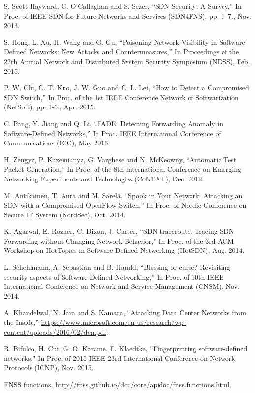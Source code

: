 \documentclass[conference]{IEEEtran}
\begin{document}
%
%
%
\begin{thebibliography}{1}

S. Scott-Hayward, G. O’Callaghan and S. Sezer,
``SDN Security: A Survey,'' In Proc. of IEEE SDN for Future Networks and Services (SDN4FNS), pp. 1–7., Nov. 2013.

S. Hong, L. Xu, H. Wang and G. Gu,
``Poisoning Network Visibility in Software-Defined Networks: New Attacks and Countermeasures,''  In Proceedings of the 22th Annual Network and Distributed System Security Symposium (NDSS), Feb. 2015.

P. W. Chi, C. T. Kuo, J. W. Guo and C. L. Lei,
``How to Detect a Compromised SDN Switch,'' In Proc. of the 1st IEEE Conference Network of Softwarization (NetSoft), pp. 1-6., Apr. 2015.

C. Pang, Y. Jiang and Q. Li,
``FADE: Detecting Forwarding Anomaly in Software-Defined Networks,'' In Proc. IEEE International Conference of Communications (ICC), May 2016.

H. Zengyz, P. Kazemianyz, G. Varghese and N. McKeowny,
``Automatic Test Packet Generation,'' In Proc. of the 8th International Conference on Emerging Networking Experiments and Technologies (CoNEXT), Dec. 2012.

M. Antikainen, T. Aura and M. Särelä,
``Spook in Your Network: Attacking an SDN with a Compromised OpenFlow Switch,'' In Proc. of Nordic Conference on Secure IT System (NordSec), Oct. 2014.

K. Agarwal, E. Rozner, C. Dixon, J. Carter,
``SDN traceroute: Tracing SDN Forwarding without Changing Network Behavior,'' In Proc. of the 3rd ACM Workshop on HotTopics in Software Defined Networking (HotSDN), Aug. 2014.

L. Schehlmann, A. Sebastian and B. Harald, 
``Blessing or curse? Revisiting security aspects of Software-Defined Networking,'' In Proc. of 10th IEEE International Conference on Network and Service Management (CNSM), Nov. 2014.

A. Khandelwal, N. Jain and S. Kamara,
``Attacking Data Center Networks from the Inside,'' \url{https://www.microsoft.com/en-us/research/wp-content/uploads/2016/02/dcn.pdf}.
 
R. Bifulco, H. Cui, G. O. Karame, F. Klaedtke,
``Fingerprinting software-defined networks,'' In Proc. of 2015 IEEE 23rd International Conference on Network Protocols (ICNP), Nov. 2015.

FNSS functions, \url{http://fnss.github.io/doc/core/apidoc/fnss.functions.html}.
\end{thebibliography}
\end{document}
